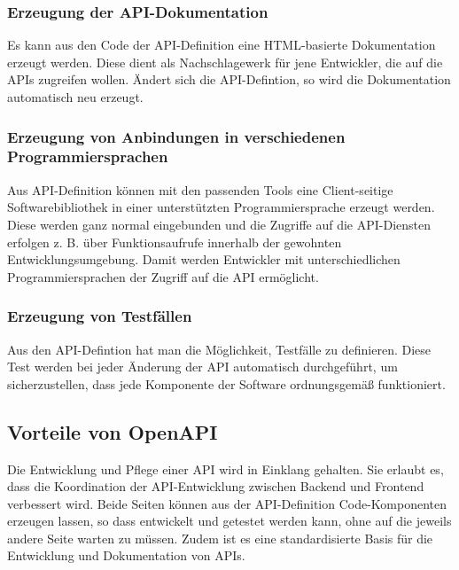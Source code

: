 \subsubsection{Erzeugung der API-Dokumentation}
Es kann aus den Code der API-Definition eine HTML-basierte Dokumentation erzeugt werden. Diese dient als Nachschlagewerk für jene Entwickler, 
die auf die APIs zugreifen wollen. Ändert sich die API-Defintion, so wird die Dokumentation automatisch neu erzeugt.

\subsubsection{Erzeugung von Anbindungen in verschiedenen Programmiersprachen}
Aus API-Definition können mit den passenden Tools eine Client-seitige Softwarebibliothek in einer unterstützten Programmiersprache 
erzeugt werden. Diese werden ganz normal eingebunden und die Zugriffe auf die API-Diensten erfolgen z. B. über Funktionsaufrufe innerhalb 
der gewohnten Entwicklungsumgebung. Damit werden Entwickler mit unterschiedlichen Programmiersprachen der Zugriff auf die API ermöglicht.

\subsubsection{Erzeugung von Testfällen}
Aus den API-Defintion hat man die Möglichkeit, Testfälle zu definieren. Diese Test werden bei jeder Änderung der API automatisch durchgeführt, 
um sicherzustellen, dass jede Komponente der Software ordnungsgemäß funktioniert.

\subsection{Vorteile von OpenAPI}
Die Entwicklung und Pflege einer API wird in Einklang gehalten. Sie erlaubt es, dass die Koordination der API-Entwicklung zwischen Backend und 
Frontend verbessert wird. Beide Seiten können aus der API-Definition Code-Komponenten erzeugen lassen, so dass entwickelt und getestet werden kann, 
ohne auf die jeweils andere Seite warten zu müssen. Zudem ist es eine standardisierte Basis für die Entwicklung und Dokumentation von APIs.

